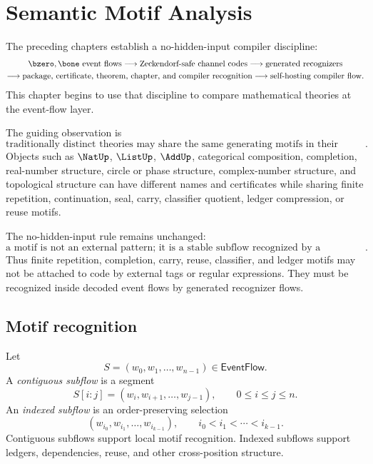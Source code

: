 \chapter{Semantic Motif Analysis}
\label{ch:ground-compiler-semantic-motif-analysis}

The preceding chapters establish a no-hidden-input compiler discipline:
$$
\begin{gathered}
  \bzero,\bone\ \text{event flows}
  \longrightarrow
  \text{Zeckendorf-safe channel codes}
  \longrightarrow
  \text{generated recognizers}\\
  \longrightarrow
  \text{package, certificate, theorem, chapter, and compiler recognition}
  \longrightarrow
  \text{self-hosting compiler flow}.
\end{gathered}
$$
This chapter begins to use that discipline to compare mathematical theories at the event-flow layer.

The guiding observation is
$$
  \boxed{\text{traditionally distinct theories may share the same generating motifs in their underlying event flows}.}
$$
Objects such as $\NatUp$, $\ListUp$, $\AddUp$, categorical composition, completion, real-number structure, circle or phase structure, complex-number structure, and topological structure can have different names and certificates while sharing finite repetition, continuation, seal, carry, classifier quotient, ledger compression, or reuse motifs.

The no-hidden-input rule remains unchanged:
$$
  \boxed{\text{a motif is not an external pattern; it is a stable subflow recognized by a generated motif recognizer}.}
$$
Thus finite repetition, completion, carry, reuse, classifier, and ledger motifs may not be attached to code by external tags or regular expressions. They must be recognized inside decoded event flows by generated recognizer flows.

\section{Motif recognition}
\label{sec:motif-generated-recognition}

\begin{definition}[Subflow]
\label{def:motif-generated-subflow}
Let
$$
  S=(w_0,w_1,\ldots,w_{n-1})\in\mathsf{EventFlow}.
$$
A \emph{contiguous subflow} is a segment
$$
  S[i:j]=(w_i,w_{i+1},\ldots,w_{j-1}),
  \qquad
  0\leq i\leq j\leq n.
$$
An \emph{indexed subflow} is an order-preserving selection
$$
  (w_{i_0},w_{i_1},\ldots,w_{i_{k-1}}),
  \qquad
  i_0<i_1<\cdots<i_{k-1}.
$$
Contiguous subflows support local motif recognition. Indexed subflows support ledgers, dependencies, reuse, and other cross-position structure.
\end{definition}


